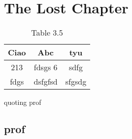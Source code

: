 
\chapter{The Lost Chapter}

\begin{table}[h!]
	\centering
	\begin{tabular}{ccc}
		\toprule
		Ciao & Abc & tyu \\
		\midrule
		213 & fdsgs 6 & sdfg \\
		fdgs & dsfgfsd & sfgsdg \\
		\bottomrule
	\end{tabular}
\caption{Table 3.5}

\end{table}

quoting prof \cite{carrera2013free}
\section{prof}
\lipsum[1-3]